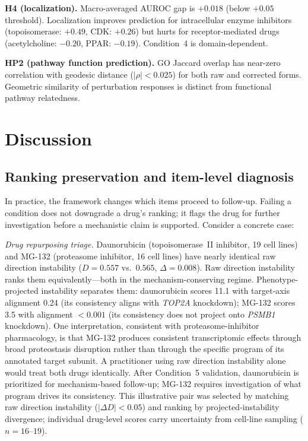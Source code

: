 \documentclass[11pt]{article}
\begin{document}
\textbf{H4 (localization).} Macro-averaged AUROC gap is $+0.018$ (below $+0.05$ threshold). Localization
improves prediction for intracellular enzyme inhibitors (topoisomerase:
$+0.49$, CDK: $+0.26$) but hurts for receptor-mediated drugs
(acetylcholine: $-0.20$, PPAR: $-0.19$). Condition~4 is domain-dependent.

\textbf{HP2 (pathway function prediction).} GO Jaccard overlap has near-zero correlation with geodesic distance
($|\rho| < 0.025$) for both raw and corrected forms. Geometric similarity
of perturbation responses is distinct from functional pathway relatedness.

\section{Discussion}

\subsection{Ranking preservation and item-level diagnosis}

In practice, the framework changes which items proceed to follow-up.
Failing a condition does not downgrade a drug's ranking; it flags the drug
for further investigation before a mechanistic claim is supported.
Consider a concrete case:

\emph{Drug repurposing triage.} Daunorubicin (topoisomerase~II inhibitor,
19 cell lines) and MG-132 (proteasome inhibitor, 16 cell lines) have
nearly identical raw direction instability ($D = 0.557$ vs.\ $0.565$,
$\Delta = 0.008$). Raw direction instability ranks them equivalently---both in the
mechanism-conserving regime. Phenotype-projected instability separates them:
daunorubicin scores 11.1 with target-axis alignment 0.24 (its consistency
aligns with \emph{TOP2A} knockdown); MG-132 scores 3.5 with alignment
$< 0.001$ (its consistency does not project onto \emph{PSMB1} knockdown).
One interpretation, consistent with proteasome-inhibitor pharmacology, is
that MG-132 produces consistent transcriptomic effects through broad
proteostasis disruption rather than through the specific program of its
annotated target subunit. A practitioner using raw direction instability alone would
treat both drugs identically. After Condition~5 validation, daunorubicin is
prioritized for mechanism-based follow-up; MG-132 requires investigation
of what program drives its consistency. This illustrative pair was selected
by matching raw direction instability ($|\Delta D| < 0.05$) and ranking by projected-instability
divergence; individual drug-level scores carry uncertainty from cell-line
sampling ($n = 16$--$19$).
\end{document}

